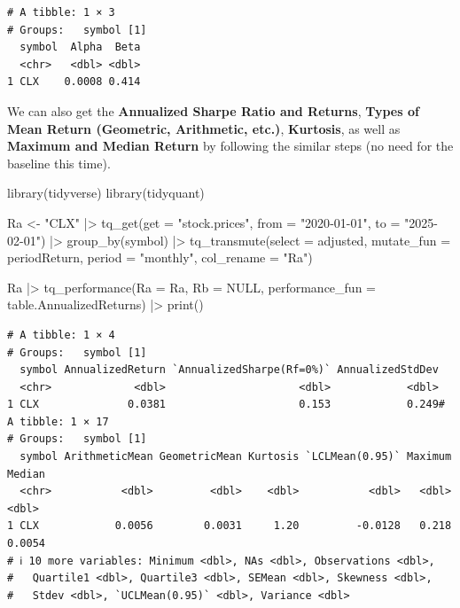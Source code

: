 \documentclass[
  letterpaper,
  DIV=11,
  numbers=noendperiod]{scrartcl}
\newenvironment{Shaded}{\begin{snugshade}}{\end{snugshade}}
\newcommand{\BuiltInTok}[1]{\textcolor[rgb]{0.00,0.23,0.31}{#1}}
\newcommand{\ImportTok}[1]{\textcolor[rgb]{0.00,0.46,0.62}{#1}}
\newcommand{\NormalTok}[1]{\textcolor[rgb]{0.00,0.23,0.31}{#1}}
\newcommand{\OperatorTok}[1]{\textcolor[rgb]{0.37,0.37,0.37}{#1}}
\newcommand{\StringTok}[1]{\textcolor[rgb]{0.13,0.47,0.30}{#1}}
\begin{document}
\begin{verbatim}
# A tibble: 1 × 3
# Groups:   symbol [1]
  symbol  Alpha  Beta
  <chr>   <dbl> <dbl>
1 CLX    0.0008 0.414
\end{verbatim}

We can also get the \textbf{Annualized Sharpe Ratio and Returns},
\textbf{Types of Mean Return (Geometric, Arithmetic, etc.)},
\textbf{Kurtosis}, as well as \textbf{Maximum and Median Return} by
following the similar steps (no need for the baseline this time).

\begin{Shaded}
\begin{Highlighting}[]
\NormalTok{library(tidyverse)}
\NormalTok{library(tidyquant)}

\NormalTok{Ra }\OperatorTok{\textless{}{-}} \StringTok{"CLX"} \OperatorTok{|\textgreater{}}
\NormalTok{    tq\_get(get  }\OperatorTok{=} \StringTok{"stock.prices"}\NormalTok{,}
           \ImportTok{from} \OperatorTok{=} \StringTok{"2020{-}01{-}01"}\NormalTok{,}
\NormalTok{           to   }\OperatorTok{=} \StringTok{"2025{-}02{-}01"}\NormalTok{) }\OperatorTok{|\textgreater{}}
\NormalTok{    group\_by(symbol) }\OperatorTok{|\textgreater{}}
\NormalTok{    tq\_transmute(select     }\OperatorTok{=}\NormalTok{ adjusted, }
\NormalTok{                 mutate\_fun }\OperatorTok{=}\NormalTok{ periodReturn, }
\NormalTok{                 period     }\OperatorTok{=} \StringTok{"monthly"}\NormalTok{, }
\NormalTok{                 col\_rename }\OperatorTok{=} \StringTok{"Ra"}\NormalTok{)}

\NormalTok{Ra }\OperatorTok{|\textgreater{}}
\NormalTok{  tq\_performance(Ra }\OperatorTok{=}\NormalTok{ Ra, Rb }\OperatorTok{=}\NormalTok{ NULL, performance\_fun }\OperatorTok{=}\NormalTok{ table.AnnualizedReturns) }\OperatorTok{|\textgreater{}}
  \BuiltInTok{print}\NormalTok{()}
\end{Highlighting}
\end{Shaded}

\begin{verbatim}
# A tibble: 1 × 4
# Groups:   symbol [1]
  symbol AnnualizedReturn `AnnualizedSharpe(Rf=0%)` AnnualizedStdDev
  <chr>             <dbl>                     <dbl>            <dbl>
1 CLX              0.0381                     0.153            0.249# A tibble: 1 × 17
# Groups:   symbol [1]
  symbol ArithmeticMean GeometricMean Kurtosis `LCLMean(0.95)` Maximum Median
  <chr>           <dbl>         <dbl>    <dbl>           <dbl>   <dbl>  <dbl>
1 CLX            0.0056        0.0031     1.20         -0.0128   0.218 0.0054
# ℹ 10 more variables: Minimum <dbl>, NAs <dbl>, Observations <dbl>,
#   Quartile1 <dbl>, Quartile3 <dbl>, SEMean <dbl>, Skewness <dbl>,
#   Stdev <dbl>, `UCLMean(0.95)` <dbl>, Variance <dbl>
\end{verbatim}
\end{document}
